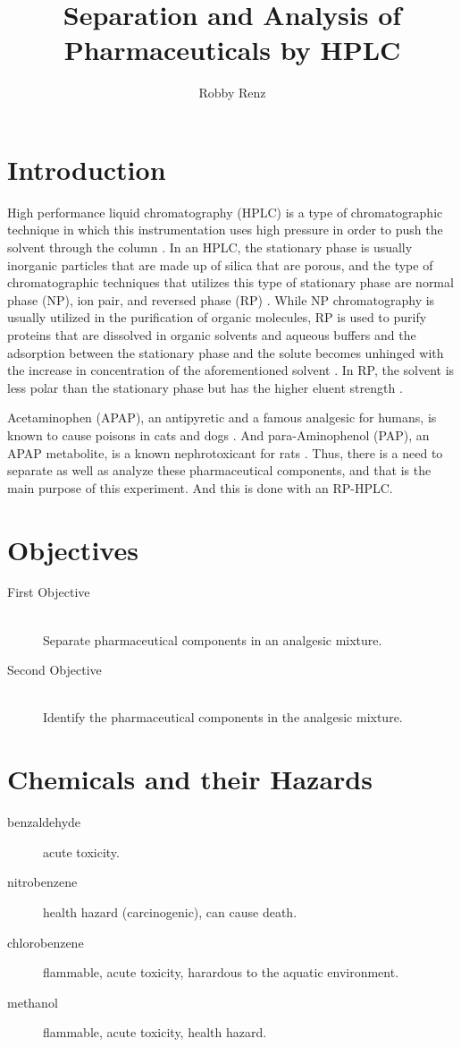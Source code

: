 \documentclass[a4paper, 12pt]{article}
\title{Separation and Analysis of Pharmaceuticals by HPLC}
\author{Robby Renz}
\begin{document}
\maketitle

\section{Introduction}
High performance liquid chromatography (HPLC) is a type of chromatographic technique in which this instrumentation uses high pressure in order to push the solvent through the column \cite{harris}. In an HPLC, the stationary phase is usually inorganic particles that are made up of silica that are porous, and the type of chromatographic techniques that utilizes this type of stationary phase are normal phase (NP), ion pair, and reversed phase (RP) \cite{mold}. While NP chromatography is usually utilized in the purification of organic molecules, RP is used to purify proteins that are dissolved in organic solvents and aqueous buffers and the adsorption between the stationary phase and the solute becomes unhinged with the increase in concentration of the aforementioned solvent \cite{prep_hplc}. In RP, the solvent is less polar than the stationary phase but has the higher eluent strength \cite{harris}. 

Acetaminophen (APAP), an antipyretic and a famous analgesic for humans, is known to cause poisons in cats and dogs \cite{dogs-cats}. And para-Aminophenol (PAP), an APAP metabolite, is a known nephrotoxicant for rats \cite{rats}. Thus, there is a need to separate as well as analyze these pharmaceutical components, and that is the main purpose of this experiment. And this is done with an RP-HPLC.

\section{Objectives}

\begin{description}
	\item[First Objective] \hfill \\
		Separate pharmaceutical components in an analgesic mixture.
	\item[Second Objective] \hfill \\
		Identify the pharmaceutical components in the analgesic mixture.
\end{description}

\section{Chemicals and their Hazards}

\begin{description}
	\item[benzaldehyde] acute toxicity.
	\item[nitrobenzene] health hazard (carcinogenic), can cause death.
	\item[chlorobenzene] flammable, acute toxicity, harardous to the aquatic environment.
	\item[methanol] flammable, acute toxicity, health hazard.
\end{description}

\printbibliography
\end{document}
